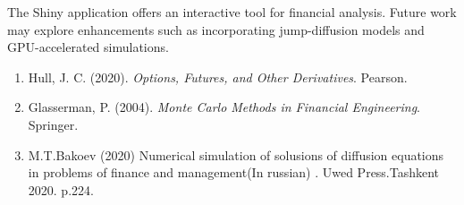 \begin{talk}
The Shiny application offers an interactive tool for financial analysis. Future work may explore enhancements such as incorporating jump-diffusion models and GPU-accelerated simulations.
\medskip

\begin{enumerate}
	\item Hull, J. C. (2020). \textit{Options, Futures, and Other Derivatives}. Pearson.
	\item Glasserman, P. (2004). \textit{Monte Carlo Methods in Financial Engineering}. Springer.
	\item M.T.Bakoev (2020) Numerical simulation of solusions of diffusion equations in problems of finance and management(In russian) . Uwed Press.Tashkent 2020. p.224.
	
\end{enumerate}

\end{talk}

